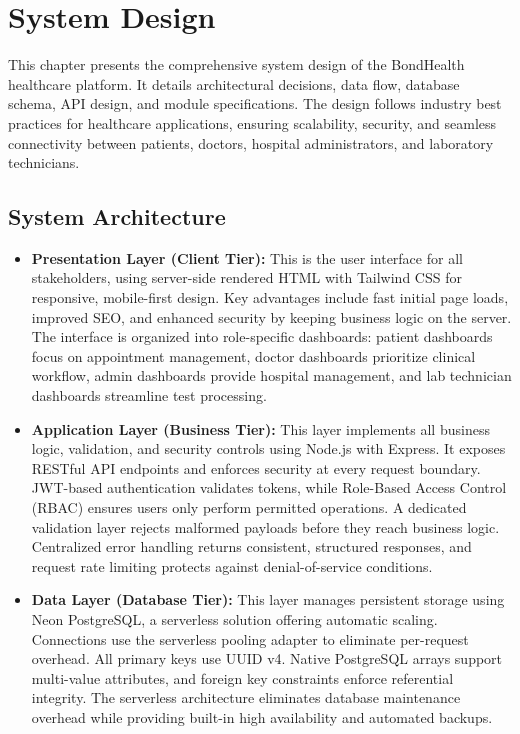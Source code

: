 \chapter{System Design}

\justifying
\noindent This chapter presents the comprehensive system design of the BondHealth healthcare platform. It details architectural decisions, data flow, database schema, API design, and module specifications. The design follows industry best practices for healthcare applications, ensuring scalability, security, and seamless connectivity between patients, doctors, hospital administrators, and laboratory technicians.


\section{System Architecture}

\begin{itemize}
    \item \textbf{Presentation Layer (Client Tier):} This is the user interface for all stakeholders, using server-side rendered HTML with Tailwind CSS for responsive, mobile-first design. Key advantages include fast initial page loads, improved SEO, and enhanced security by keeping business logic on the server. The interface is organized into role-specific dashboards: patient dashboards focus on appointment management, doctor dashboards prioritize clinical workflow, admin dashboards provide hospital management, and lab technician dashboards streamline test processing.

    \item \textbf{Application Layer (Business Tier):} This layer implements all business logic, validation, and security controls using Node.js with Express. It exposes RESTful API endpoints and enforces security at every request boundary. JWT-based authentication validates tokens, while Role-Based Access Control (RBAC) ensures users only perform permitted operations. A dedicated validation layer rejects malformed payloads before they reach business logic. Centralized error handling returns consistent, structured responses, and request rate limiting protects against denial-of-service conditions.

    \item \textbf{Data Layer (Database Tier):} This layer manages persistent storage using Neon PostgreSQL, a serverless solution offering automatic scaling. Connections use the serverless pooling adapter to eliminate per-request overhead. All primary keys use UUID v4. Native PostgreSQL arrays support multi-value attributes, and foreign key constraints enforce referential integrity. The serverless architecture eliminates database maintenance overhead while providing built-in high availability and automated backups.
\end{itemize}

